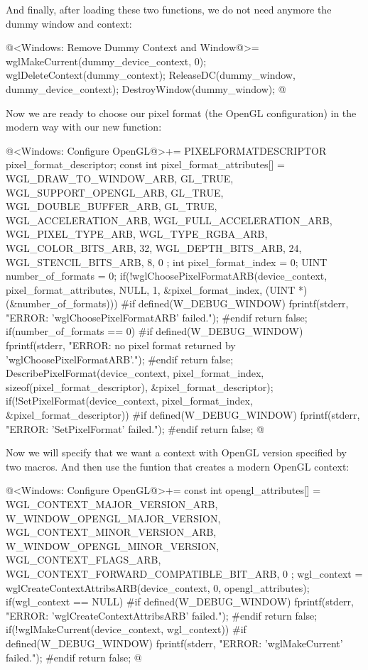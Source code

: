 And finally, after loading these two functions, we do not need anymore
the dummy window and context:

\iniciocodigo
@<Windows: Remove Dummy Context and Window@>=
wglMakeCurrent(dummy_device_context, 0);
wglDeleteContext(dummy_context);
ReleaseDC(dummy_window, dummy_device_context);
DestroyWindow(dummy_window);
@
\fimcodigo

Now we are ready to choose our pixel format (the OpenGL configuration)
in the modern way with our new function:

\iniciocodigo
@<Windows: Configure OpenGL@>+=
{
  PIXELFORMATDESCRIPTOR pixel_format_descriptor;
  const int pixel_format_attributes[] = {
    WGL_DRAW_TO_WINDOW_ARB, GL_TRUE,
    WGL_SUPPORT_OPENGL_ARB, GL_TRUE,
    WGL_DOUBLE_BUFFER_ARB, GL_TRUE,
    WGL_ACCELERATION_ARB, WGL_FULL_ACCELERATION_ARB,
    WGL_PIXEL_TYPE_ARB, WGL_TYPE_RGBA_ARB,
    WGL_COLOR_BITS_ARB, 32,
    WGL_DEPTH_BITS_ARB, 24,
    WGL_STENCIL_BITS_ARB, 8,
    0 };
  int pixel_format_index = 0;
  UINT number_of_formats = 0;
  if(!wglChoosePixelFormatARB(device_context, pixel_format_attributes, NULL, 1,
                              &pixel_format_index,
                              (UINT *) (&number_of_formats))){
#if defined(W_DEBUG_WINDOW)
     fprintf(stderr, "ERROR: 'wglChoosePixelFormatARB' failed.\n");
#endif
     return false;
  }
  if(number_of_formats == 0){
#if defined(W_DEBUG_WINDOW)
     fprintf(stderr,
             "ERROR: no pixel format returned by 'wglChoosePixelFormatARB'.\n");
#endif
     return false;
  }
  DescribePixelFormat(device_context, pixel_format_index,
                      sizeof(pixel_format_descriptor), &pixel_format_descriptor);
  if(!SetPixelFormat(device_context, pixel_format_index,
                     &pixel_format_descriptor)){
#if defined(W_DEBUG_WINDOW)
    fprintf(stderr, "ERROR: 'SetPixelFormat' failed.\n");
#endif
    return false;
  } 
}
@
\fimcodigo


Now we will specify that we want a context with OpenGL version
specified by two macros. And then use the funtion that creates a
modern OpenGL context:

\iniciocodigo
@<Windows: Configure OpenGL@>+=
{
  const int opengl_attributes[] = {
    WGL_CONTEXT_MAJOR_VERSION_ARB, W_WINDOW_OPENGL_MAJOR_VERSION,
    WGL_CONTEXT_MINOR_VERSION_ARB, W_WINDOW_OPENGL_MINOR_VERSION,
    WGL_CONTEXT_FLAGS_ARB, WGL_CONTEXT_FORWARD_COMPATIBLE_BIT_ARB,
    0 };
  wgl_context = wglCreateContextAttribsARB(device_context, 0, opengl_attributes);
  if(wgl_context == NULL){
#if defined(W_DEBUG_WINDOW)
    fprintf(stderr, "ERROR: 'wglCreateContextAttribsARB' failed.\n");
#endif
    return false;
  }
  if(!wglMakeCurrent(device_context, wgl_context)){
#if defined(W_DEBUG_WINDOW)
    fprintf(stderr, "ERROR: 'wglMakeCurrent' failed.\n");
#endif
    return false;
  }
}
@
\fimcodigo

